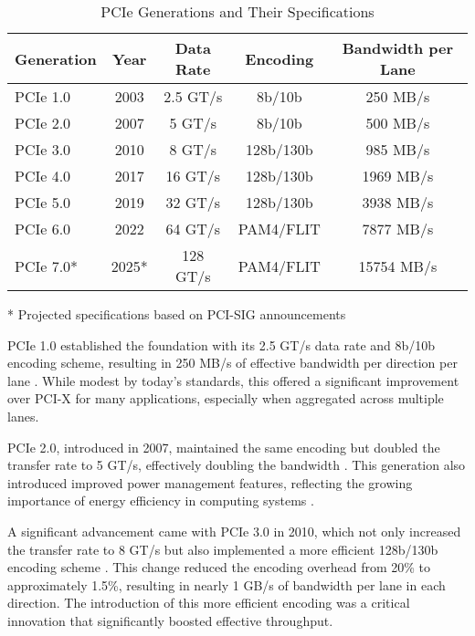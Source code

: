 \begin{table}[ht]
\centering
\caption{\ac{PCIe} Generations and Their Specifications}
\label{tab:pcie_generations}
\begin{tabular}{|l|c|c|c|c|}
\hline
\textbf{Generation} & \textbf{Year} & \textbf{Data Rate} & \textbf{Encoding} & \textbf{Bandwidth per Lane} \\
\hline
\acs{PCIe} 1.0 & 2003 & 2.5 \acs{GT/s} & 8b/10b & 250 MB/s \\ 
\acs{PCIe} 2.0 & 2007 & 5 \acs{GT/s} & 8b/10b & 500 MB/s \\ 
\acs{PCIe} 3.0 & 2010 & 8 \acs{GT/s} & 128b/130b & 985 MB/s \\ 
\acs{PCIe} 4.0 & 2017 & 16 \acs{GT/s} & 128b/130b & 1969 MB/s \\ 
\acs{PCIe} 5.0 & 2019 & 32 \acs{GT/s} & 128b/130b & 3938 MB/s \\ 
\acs{PCIe} 6.0 & 2022 & 64 \acs{GT/s} & \acs{PAM4}/\acs{FLIT} & 7877 MB/s \\ 
\acs{PCIe} 7.0* & 2025* & 128 \acs{GT/s} & \acs{PAM4}/\acs{FLIT} & 15754 MB/s \\
\hline
\end{tabular}
\begin{flushleft}
\small{* Projected specifications based on \ac{PCI-SIG} announcements \parencite{pcisig2023}}
\end{flushleft}
\end{table}

\ac{PCIe} 1.0 established the foundation with its 2.5 \ac{GT/s} data rate and 
8b/10b encoding scheme, resulting in 250 MB/s of effective bandwidth per direction 
per lane \parencite{budruk2003pci}. While modest by today's standards, 
this offered a significant improvement over \ac{PCI-X} for many applications, 
especially when aggregated across multiple lanes.

\ac{PCIe} 2.0, introduced in 2007, maintained the same encoding but doubled 
the transfer rate to 5 \ac{GT/s}, effectively doubling the bandwidth 
\parencite{pcisig2007}. This generation also introduced improved 
power management features, reflecting the growing importance of energy 
efficiency in computing systems \parencite{johnson2010pcie}.

A significant advancement came with \ac{PCIe} 3.0 in 2010, which not only 
increased the transfer rate to 8 \ac{GT/s} but also implemented a more 
efficient 128b/130b encoding scheme \parencite{pcisig2010}. 
This change reduced the encoding overhead from 20\% to approximately 
1.5\%, resulting in nearly 1 GB/s of bandwidth per lane in each direction. 
The introduction of this more efficient encoding was a critical innovation 
that significantly boosted effective throughput.

